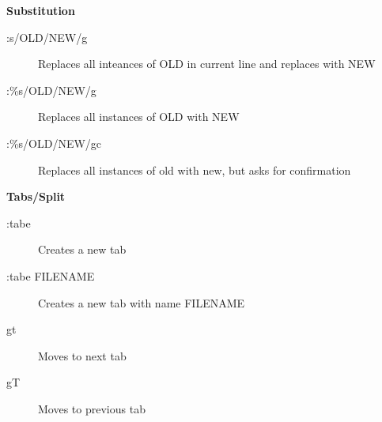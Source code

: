 \documentclass{article}
\begin{document}
\begin{multicols}{2}
\begin{center}
\Large\textbf{Substitution}
\end{center}
\begin{description}
\item[:s/OLD/NEW/g] \hfill
Replaces all inteances of OLD in current line and replaces with NEW
\item[:\%s/OLD/NEW/g] \hfill
Replaces all instances of OLD with NEW
\item[:\%s/OLD/NEW/gc] \hfill
Replaces all instances of old with new, but asks for confirmation
\end{description}
\columnbreak
\begin{center}
\Large\textbf{Tabs/Split}
\end{center}
\begin{description}
\item[:tabe] \hfill
Creates a new tab
\item[:tabe FILENAME] \hfill
Creates a new tab with name FILENAME
\item[gt] \hfill
Moves to next tab
\item[gT] \hfill
Moves to previous tab
\end{description}

\end{multicols}
\end{document}
